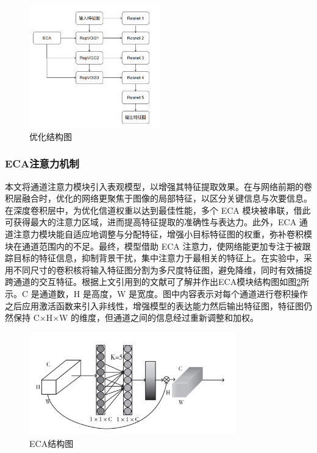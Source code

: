 \begin{figure}[htbp] %
	\centering
	\includegraphics[width=0.5\textwidth]{np7} %
	\caption{优化结构图} %
	\label{fig:np7} %
\end{figure}


\subsubsection{ECA注意力机制}

本文将通道注意力模块\cite{QCYK20250429002}引入表观模型，以增强其特征提取效果。在与网络前期的卷积层融合时，优化的网络更聚焦于图像的局部特征，以区分关键信息与次要信息。在深度卷积层中，为优化信道权重以达到最佳性能，多个 ECA 模块被串联，借此可获得最大的注意力区域，进而提高特征提取的准确性与表达力。此外，ECA 通道注意力模块能自适应地调整与分配特征，增强小目标特征图的权重，弥补卷积模块在通道范围内的不足。最终，模型借助 ECA 注意力，使网络能更加专注于被跟踪目标的特征信息，抑制背景干扰，集中注意力于最相关的特征上。在实验中，采用不同尺寸的卷积核将输入特征图分割为多尺度特征图，避免降维，同时有效捕捉跨通道的交互特征。根据上文引用到的文献可了解并作出ECA模块结构图如图\ref{fig:np8}所示。C 是通道数，H 是高度，W 是宽度。图中内容表示对每个通道进行卷积操作之后应用激活函数来引入非线性，增强模型的表达能力然后输出特征图，特征图仍然保持 C×H×W 的维度，但通道之间的信息经过重新调整和加权。

\begin{figure}[htbp] %
	\centering
	\includegraphics[width=0.8\textwidth]{np8} %
	\caption{ECA结构图} %
	\label{fig:np8} %
\end{figure}

